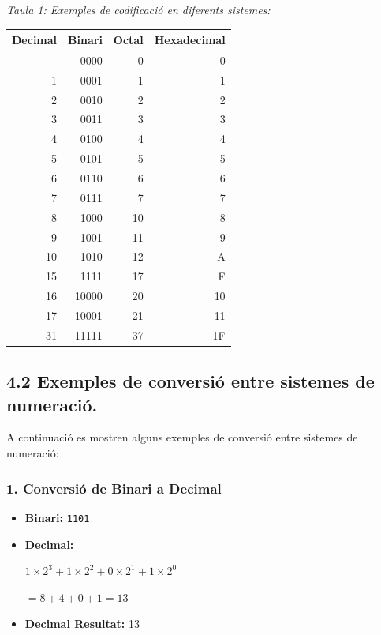 \documentclass[
  12 pt,
  a4paper,
]{article}
\begin{document}
\emph{Taula 1: Exemples de codificació en diferents sistemes:}

\begin{longtable}[]{@{}rrrr@{}}
\toprule\noalign{}
Decimal & Binari & Octal & Hexadecimal \\
\midrule\noalign{}
\endhead
\bottomrule\noalign{}
\endlastfoot
0 & 0000 & 0 & 0 \\
1 & 0001 & 1 & 1 \\
2 & 0010 & 2 & 2 \\
3 & 0011 & 3 & 3 \\
4 & 0100 & 4 & 4 \\
5 & 0101 & 5 & 5 \\
6 & 0110 & 6 & 6 \\
7 & 0111 & 7 & 7 \\
8 & 1000 & 10 & 8 \\
9 & 1001 & 11 & 9 \\
10 & 1010 & 12 & A \\
15 & 1111 & 17 & F \\
16 & 10000 & 20 & 10 \\
17 & 10001 & 21 & 11 \\
31 & 11111 & 37 & 1F \\
\end{longtable}

\subsection{4.2 Exemples de conversió entre sistemes de
numeració.}\label{exemples-de-conversiuxf3-entre-sistemes-de-numeraciuxf3.}

A continuació es mostren alguns exemples de conversió entre sistemes de
numeració:

\subsubsection{1. Conversió de Binari a
Decimal}\label{conversiuxf3-de-binari-a-decimal}

\begin{itemize}
\item
  \textbf{Binari:} \texttt{1101}
\item
  \textbf{Decimal:}

  \(1 \times 2^3 + 1 \times 2^2 + 0 \times 2^1 + 1 \times 2^0\)

  \(= 8 + 4 + 0 + 1 = 13\)
\item
  \textbf{Decimal Resultat:} 13
\end{itemize}
\end{document}
